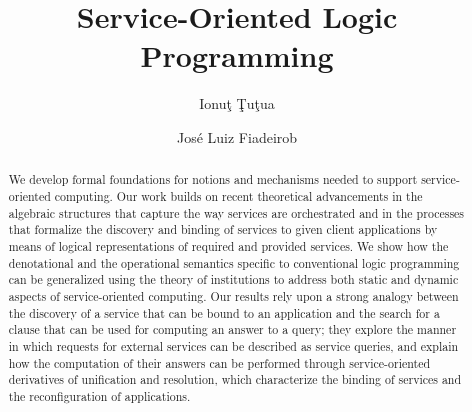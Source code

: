 \documentclass{LMCS}
\begin{document}
\title[Service-Oriented Logic Programming]{Service-Oriented Logic Programming\rsuper*}

\author[I.\ \c{T}u\c{t}u]{Ionu\c{t} \c{T}u\c{t}u\rsuper a}
\address{{\lsuper a}Department of Computer Science, Royal Holloway University of London \newline
  Institute of Mathematics of the Romanian Academy, Research group of the project ID-3-0439}

\author[J.\,L.\ Fiadeiro]{Jos\'{e} Luiz Fiadeiro\rsuper b}
\address{{\lsuper b}Department of Computer Science, Royal Holloway University of London}



\begin{abstract}
  \noindent We develop formal foundations for notions and mechanisms needed to support service-oriented computing.
  Our work builds on recent theoretical advancements in the algebraic structures that capture the way services are orchestrated and in the processes that formalize the discovery and binding of services to given client applications by means of logical representations of required and provided services.
  We show how the denotational and the operational semantics specific to conventional logic programming can be generalized using the theory of institutions to address both static and dynamic aspects of service-oriented computing.
  Our results rely upon a strong analogy between the discovery of a service that can be bound to an application and the search for a clause that can be used for computing an answer to a query; they explore the manner in which requests for external services can be described as service queries, and explain how the computation of their answers can be performed through service-oriented derivatives of unification and resolution, which characterize the binding of services and the reconfiguration of applications.
\end{abstract}

\maketitle
\end{document}
